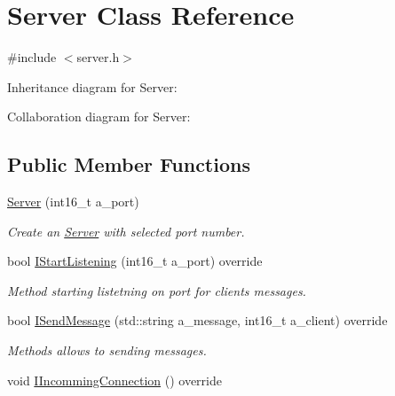 \hypertarget{classServer}{}\section{Server Class Reference}
\label{classServer}


{\ttfamily \#include $<$server.\+h$>$}



Inheritance diagram for Server\+:


Collaboration diagram for Server\+:
\subsection*{Public Member Functions}
\begin{DoxyCompactItemize}
\item 
\hyperlink{classServer_aa8e412812671a005a6c530f8510db931}{Server} (int16\+\_\+t a\+\_\+port)\hypertarget{classServer_aa8e412812671a005a6c530f8510db931}{}\label{classServer_aa8e412812671a005a6c530f8510db931}

\begin{DoxyCompactList}\small\item\em Create an \hyperlink{classServer}{Server} with selected port number. \end{DoxyCompactList}\item 
bool \hyperlink{classServer_a15eef69cccd5dba122a76f63b13e1733}{I\+Start\+Listening} (int16\+\_\+t a\+\_\+port) override\hypertarget{classServer_a15eef69cccd5dba122a76f63b13e1733}{}\label{classServer_a15eef69cccd5dba122a76f63b13e1733}

\begin{DoxyCompactList}\small\item\em Method starting listetning on port for clients messages. \end{DoxyCompactList}\item 
bool \hyperlink{classServer_a7f43c5c286c0a64624a803fcf2f3c85a}{I\+Send\+Message} (std\+::string a\+\_\+message, int16\+\_\+t a\+\_\+client) override\hypertarget{classServer_a7f43c5c286c0a64624a803fcf2f3c85a}{}\label{classServer_a7f43c5c286c0a64624a803fcf2f3c85a}

\begin{DoxyCompactList}\small\item\em Methods allows to sending messages. \end{DoxyCompactList}\item 
void \hyperlink{classServer_a404070676bda1e2582cd6b467e73b6a2}{I\+Incomming\+Connection} () override\hypertarget{classServer_a404070676bda1e2582cd6b467e73b6a2}{}\label{classServer_a404070676bda1e2582cd6b467e73b6a2}


\end{DoxyCompactItemize}
